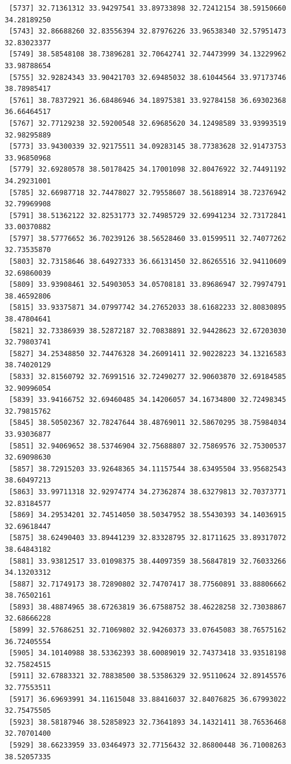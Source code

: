 \documentclass[
  letterpaper,
  DIV=11,
  numbers=noendperiod]{scrartcl}
\begin{document}
\begin{verbatim}
 [5737] 32.71361312 33.94297541 33.89733898 32.72412154 38.59150660 34.28189250
 [5743] 32.86688260 32.83556394 32.87976226 33.96538340 32.57951473 32.83023377
 [5749] 38.58548108 38.73896281 32.70642741 32.74473999 34.13229962 33.98788654
 [5755] 32.92824343 33.90421703 32.69485032 38.61044564 33.97173746 38.78985417
 [5761] 38.78372921 36.68486946 34.18975381 33.92784158 36.69302368 36.66464517
 [5767] 32.77129238 32.59200548 32.69685620 34.12498589 33.93993519 32.98295889
 [5773] 33.94300339 32.92175511 34.09283145 38.77383628 32.91473753 33.96850968
 [5779] 32.69280578 38.50178425 34.17001098 32.80476922 32.74491192 34.29231001
 [5785] 32.66987718 32.74478027 32.79558607 38.56188914 38.72376942 32.79969908
 [5791] 38.51362122 32.82531773 32.74985729 32.69941234 32.73172841 33.00370882
 [5797] 38.57776652 36.70239126 38.56528460 33.01599511 32.74077262 32.73535870
 [5803] 32.73158646 38.64927333 36.66131450 32.86265516 32.94110609 32.69860039
 [5809] 33.93908461 32.54903053 34.05708181 33.89686947 32.79974791 38.46592806
 [5815] 33.93375871 34.07997742 34.27652033 38.61682233 32.80830895 38.47804641
 [5821] 32.73386939 38.52872187 32.70838891 32.94428623 32.67203030 32.79803741
 [5827] 34.25348850 32.74476328 34.26091411 32.90228223 34.13216583 38.74020129
 [5833] 32.81560792 32.76991516 32.72490277 32.90603870 32.69184585 32.90996054
 [5839] 33.94166752 32.69460485 34.14206057 34.16734800 32.72498345 32.79815762
 [5845] 38.50502367 32.78247644 38.48769011 32.58670295 38.75984034 33.93036877
 [5851] 32.94069652 38.53746904 32.75688807 32.75869576 32.75300537 32.69098630
 [5857] 38.72915203 33.92648365 34.11157544 38.63495504 33.95682543 38.60497213
 [5863] 33.99711318 32.92974774 34.27362874 38.63279813 32.70373771 32.83184577
 [5869] 34.29534201 32.74514050 38.50347952 38.55430393 34.14036915 32.69618447
 [5875] 38.62490403 33.89441239 32.83328795 32.81711625 33.89317072 38.64843182
 [5881] 33.93812517 33.01098375 38.44097359 38.56847819 32.76033266 34.13203312
 [5887] 32.71749173 38.72890802 32.74707417 38.77560891 33.88806662 38.76502161
 [5893] 38.48874965 38.67263819 36.67588752 38.46228258 32.73038867 32.68666228
 [5899] 32.57686251 32.71069802 32.94260373 33.07645083 38.76575162 36.72405554
 [5905] 34.10140988 38.53362393 38.60089019 32.74373418 33.93518198 32.75824515
 [5911] 32.67883321 32.78838500 38.53586329 32.95110624 32.89145576 32.77553511
 [5917] 36.69693991 34.11615048 33.88416037 32.84076825 36.67993022 32.75475505
 [5923] 38.58187946 38.52858923 32.73641893 34.14321411 38.76536468 32.70701400
 [5929] 38.66233959 33.03464973 32.77156432 32.86800448 36.71008263 38.52057335

\end{verbatim}
\end{document}
